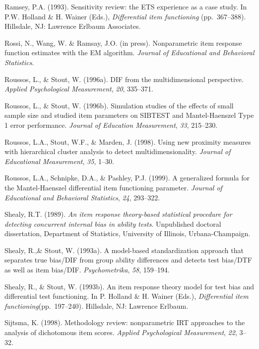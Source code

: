 \documentclass[titlepage,11pt,twoside]{article}
\begin{document}
\begin{thebibliography}
\bibitem Ramsey, P.A. (1993). Sensitivity review: the ETS experience as a case study. In P.W. Holland \& H. Wainer (Eds.), \textit{Differential item functioning} (pp.~367--388). Hillsdale, NJ: Lawrence Erlbaum Associates.

\bibitem Rossi, N., Wang, W. \& Ramsay, J.O. (in press). Nonparametric item response function estimates with the EM algorithm. \textit{Journal of Educational and Behavioral Statistics}.

\bibitem Roussos, L., \& Stout, W. (1996a). DIF from the multidimensional perspective. \textit{Applied Psychological Measurement}, \textit{20}, 335--371.

\bibitem Roussos, L., \& Stout, W. (1996b). Simulation studies of the effects of small sample size and studied item parameters on SIBTEST and Mantel-Haenszel Type 1 error performance. \textit{Journal of Education Measurement}, \textit{33}, 215--230.

\bibitem Roussos, L.A., Stout, W.F., \& Marden, J. (1998). Using new proximity measures with hierarchical cluster analysis to detect multidimensionality. \textit{Journal of Educational Measurement}, \textit{35}, 1--30.

\bibitem Roussos, L.A., Schnipke, D.A., \& Pashley, P.J. (1999). A generalized formula for the Mantel-Haenszel differential item functioning parameter. \textit{Journal of Educational and Behavioral Statistics}, \textit{24}, 293--322.

\bibitem Shealy, R.T. (1989). \textit{An item response theory-based statistical procedure for detecting concurrent internal bias in ability tests}. Unpublished doctoral dissertation, Department of Statistics, University of Illinois, Urbana-Champaign.

Shealy, R.,\& Stout, W. (1993a). A model-based standardization approach that separates true bias/DIF from group ability differences and detects test bias/DTF as well as item bias/DIF. \textit{Psychometrika}, \textit{58}, 159--194.

\bibitem Shealy, R., \& Stout, W. (1993b). An item response theory model for test bias and differential test functioning. In P. Holland \& H. Wainer (Eds.), \textit{Differential item functioning}(pp.~197--240). Hillsdale, NJ: Lawrence Erlbaum.

\bibitem Sijtsma, K. (1998). Methodology review: nonparametric IRT approaches to the analysis of dichotomous item scores. \textit{Applied Psychological Measurement}, \textit{22}, 3--32.

\bibitem Sternberg, R.J. (1985). \textit{Beyond IQ: A triarchic theory of human intelligence}. New York, NY: Cambridge University Press.


\end{thebibliography}
\end{document}
